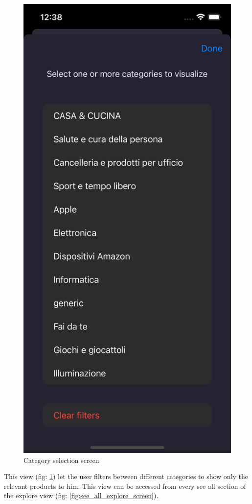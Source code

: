 \begin{figure}[h!]
        \centering
        \includegraphics[scale=0.15]{images/interfaces/category_selection_screen.png}
        \caption{Category selection screen}
        \label{fig:category_selection_screen}
\end{figure}
\FloatBarrier
This view (fig: \ref{fig:category_selection_screen}) let the user filters between different categories to show only the relevant products to him. This view can be accessed from every see all section of the explore view (fig: \ref{fig:see_all_explore_screen}).


